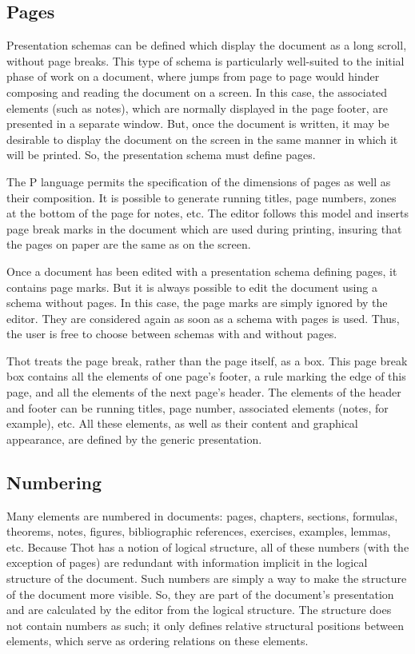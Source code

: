 \subsection{Pages}

Presentation schemas can be defined which display the document as a
long scroll, without page breaks.  This type of schema is particularly
well-suited to the initial phase of work on a document, where jumps
from page to page would hinder composing and reading the document on a
screen.  In this case, the associated elements (such as notes), which
are normally displayed in the page footer, are presented in a separate
window.  But, once the document is written, it may be desirable to
display the document on the screen in the same manner in which it will
be printed.  So, the presentation schema must define pages.

The P language permits the specification of the dimensions of pages as
well as their composition.  It is possible to generate running titles,
page numbers, zones at the bottom of the page for notes, etc.  The
editor follows this model and inserts page break marks in the document
which are used during printing, insuring that the pages on paper are
the same as on the screen.

Once a document has been edited with a presentation schema defining
pages, it contains page marks.  But it is always possible to edit the
document using a schema without pages.  In this case, the page marks
are simply ignored by the editor.  They are considered again as soon
as a schema with pages is used.  Thus, the user is free to choose
between schemas with and without pages.

Thot treats the page break, rather than the page itself, as a box.
This page break box contains all the elements of one page's footer, a
rule marking the edge of this page, and all the elements of the next
page's header.  The elements of the header and footer can be running
titles, page number, associated elements (notes, for example), etc.
All these elements, as well as their content and graphical appearance,
are defined by the generic presentation.

\subsection{Numbering}

Many elements are numbered in documents: pages, chapters, sections,
formulas, theorems, notes, figures, bibliographic references,
exercises, examples, lemmas, etc.  Because Thot has a notion of
logical structure, all of these numbers (with the exception of pages)
are redundant with information implicit in the logical structure of
the document.  Such numbers are simply a way to make the structure of
the document more visible.  So, they are part of the document's
presentation and are calculated by the editor from the logical
structure.  The structure does not contain numbers as such; it only
defines relative structural positions between elements, which serve as
ordering relations on these elements.

